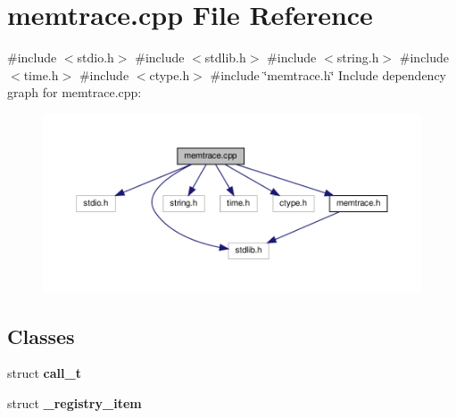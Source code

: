 \section{memtrace.\+cpp File Reference}
\label{memtrace_8cpp}
{\ttfamily \#include $<$stdio.\+h$>$}\newline
{\ttfamily \#include $<$stdlib.\+h$>$}\newline
{\ttfamily \#include $<$string.\+h$>$}\newline
{\ttfamily \#include $<$time.\+h$>$}\newline
{\ttfamily \#include $<$ctype.\+h$>$}\newline
{\ttfamily \#include \char`\"{}memtrace.\+h\char`\"{}}\newline
Include dependency graph for memtrace.\+cpp\+:
\nopagebreak
\begin{figure}[H]
\begin{center}
\leavevmode
\includegraphics[width=350pt]{memtrace_8cpp__incl}
\end{center}
\end{figure}
\subsection*{Classes}
\begin{DoxyCompactItemize}
\item 
struct \textbf{ call\+\_\+t}
\item 
struct \textbf{ \+\_\+registry\+\_\+item}
\end{DoxyCompactItemize}
